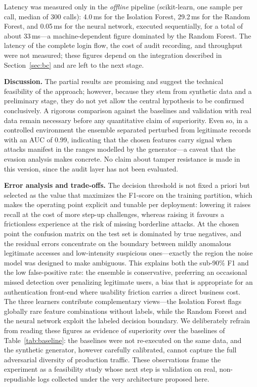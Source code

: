 \documentclass[conference]{IEEEtran}
\begin{document}
Latency was measured only in the \emph{offline} pipeline (scikit-learn,
one sample per call, median of 300 calls): 4.0\,ms for the Isolation
Forest, 29.2\,ms for the Random Forest, and 0.05\,ms for the neural
network, executed sequentially, for a total of about 33\,ms---a
machine-dependent figure dominated by the Random Forest. The latency of
the complete login flow, the cost of audit recording, and throughput were
not measured; these figures depend on the integration described in
Section~\ref{sec:bc} and are left to the next stage.

\textbf{Discussion.} The partial results are promising and suggest the
technical feasibility of the approach; however, because they stem from
synthetic data and a preliminary stage, they do not yet allow the
central hypothesis to be confirmed conclusively. A rigorous comparison
against the baselines and validation with real data remain necessary
before any quantitative claim of superiority. Even so, in a
controlled environment the ensemble separated perturbed from legitimate
records with an AUC of 0.99, indicating that the chosen features carry
signal when attacks manifest in the ranges modelled by the generator---a
caveat that the evasion analysis makes concrete. No
claim about tamper resistance is made in this version, since the audit
layer has not been evaluated.

\textbf{Error analysis and trade-offs.} The decision threshold is not
fixed a priori but selected as the value that maximizes the F1-score on
the training partition, which makes the operating point explicit and
tunable per deployment: lowering it raises recall at the cost of more
step-up challenges, whereas raising it favours a frictionless experience
at the risk of missing borderline attacks. At the chosen point the
confusion matrix on the test set is dominated by true negatives, and the
residual errors concentrate on the boundary between mildly anomalous
legitimate accesses and low-intensity suspicious ones---exactly the
region the noise model was designed to make ambiguous. This explains
both the sub-90\% F1 and the low false-positive rate: the ensemble is
conservative, preferring an occasional missed detection over penalizing
legitimate users, a bias that is appropriate for an authentication
front-end where usability friction carries a direct business cost. The
three learners contribute complementary views---the Isolation Forest
flags globally rare feature combinations without labels, while the
Random Forest and the neural network exploit the labeled decision
boundary. We deliberately refrain from reading these
figures as evidence of superiority over the baselines of
Table~\ref{tab:baseline}: the baselines were not re-executed on the same
data, and the synthetic generator, however carefully calibrated, cannot
capture the full adversarial diversity of production traffic. These
observations frame the experiment as a feasibility study whose next step
is validation on real, non-repudiable logs collected under the very
architecture proposed here.
\end{document}
